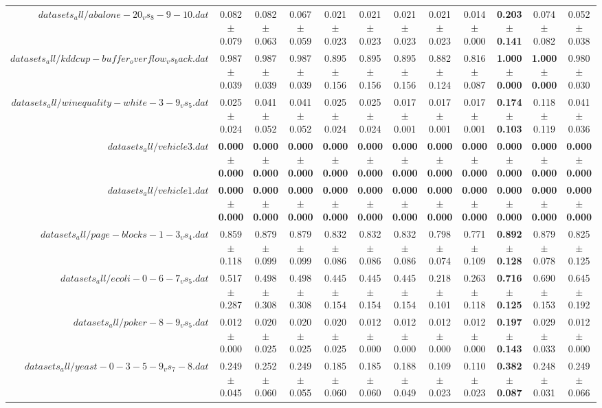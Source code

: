\begin{table}[!ht]
{\begin{tabular}{r c c c c c c c c c c c}
$datasets_all/abalone-20_vs_8-9-10.dat$ & 0.082 $\pm$ 0.079 & 0.082 $\pm$ 0.063 & 0.067 $\pm$ 0.059 & 0.021 $\pm$ 0.023 & 0.021 $\pm$ 0.023 & 0.021 $\pm$ 0.023 & 0.021 $\pm$ 0.023 & 0.014 $\pm$ 0.000 & \textbf{0.203 $\pm$ 0.141} & 0.074 $\pm$ 0.082 & 0.052 $\pm$ 0.038 \\
$datasets_all/kddcup-buffer_overflow_vs_back.dat$ & 0.987 $\pm$ 0.039 & 0.987 $\pm$ 0.039 & 0.987 $\pm$ 0.039 & 0.895 $\pm$ 0.156 & 0.895 $\pm$ 0.156 & 0.895 $\pm$ 0.156 & 0.882 $\pm$ 0.124 & 0.816 $\pm$ 0.087 & \textbf{1.000 $\pm$ 0.000} & \textbf{1.000 $\pm$ 0.000} & 0.980 $\pm$ 0.030 \\
$datasets_all/winequality-white-3-9_vs_5.dat$ & 0.025 $\pm$ 0.024 & 0.041 $\pm$ 0.052 & 0.041 $\pm$ 0.052 & 0.025 $\pm$ 0.024 & 0.025 $\pm$ 0.024 & 0.017 $\pm$ 0.001 & 0.017 $\pm$ 0.001 & 0.017 $\pm$ 0.001 & \textbf{0.174 $\pm$ 0.103} & 0.118 $\pm$ 0.119 & 0.041 $\pm$ 0.036 \\
$datasets_all/vehicle3.dat$ & \textbf{0.000 $\pm$ 0.000} & \textbf{0.000 $\pm$ 0.000} & \textbf{0.000 $\pm$ 0.000} & \textbf{0.000 $\pm$ 0.000} & \textbf{0.000 $\pm$ 0.000} & \textbf{0.000 $\pm$ 0.000} & \textbf{0.000 $\pm$ 0.000} & \textbf{0.000 $\pm$ 0.000} & \textbf{0.000 $\pm$ 0.000} & \textbf{0.000 $\pm$ 0.000} & \textbf{0.000 $\pm$ 0.000} \\
$datasets_all/vehicle1.dat$ & \textbf{0.000 $\pm$ 0.000} & \textbf{0.000 $\pm$ 0.000} & \textbf{0.000 $\pm$ 0.000} & \textbf{0.000 $\pm$ 0.000} & \textbf{0.000 $\pm$ 0.000} & \textbf{0.000 $\pm$ 0.000} & \textbf{0.000 $\pm$ 0.000} & \textbf{0.000 $\pm$ 0.000} & \textbf{0.000 $\pm$ 0.000} & \textbf{0.000 $\pm$ 0.000} & \textbf{0.000 $\pm$ 0.000} \\
$datasets_all/page-blocks-1-3_vs_4.dat$ & 0.859 $\pm$ 0.118 & 0.879 $\pm$ 0.099 & 0.879 $\pm$ 0.099 & 0.832 $\pm$ 0.086 & 0.832 $\pm$ 0.086 & 0.832 $\pm$ 0.086 & 0.798 $\pm$ 0.074 & 0.771 $\pm$ 0.109 & \textbf{0.892 $\pm$ 0.128} & 0.879 $\pm$ 0.078 & 0.825 $\pm$ 0.125 \\
$datasets_all/ecoli-0-6-7_vs_5.dat$ & 0.517 $\pm$ 0.287 & 0.498 $\pm$ 0.308 & 0.498 $\pm$ 0.308 & 0.445 $\pm$ 0.154 & 0.445 $\pm$ 0.154 & 0.445 $\pm$ 0.154 & 0.218 $\pm$ 0.101 & 0.263 $\pm$ 0.118 & \textbf{0.716 $\pm$ 0.125} & 0.690 $\pm$ 0.153 & 0.645 $\pm$ 0.192 \\
$datasets_all/poker-8-9_vs_5.dat$ & 0.012 $\pm$ 0.000 & 0.020 $\pm$ 0.025 & 0.020 $\pm$ 0.025 & 0.020 $\pm$ 0.025 & 0.012 $\pm$ 0.000 & 0.012 $\pm$ 0.000 & 0.012 $\pm$ 0.000 & 0.012 $\pm$ 0.000 & \textbf{0.197 $\pm$ 0.143} & 0.029 $\pm$ 0.033 & 0.012 $\pm$ 0.000 \\
$datasets_all/yeast-0-3-5-9_vs_7-8.dat$ & 0.249 $\pm$ 0.045 & 0.252 $\pm$ 0.060 & 0.249 $\pm$ 0.055 & 0.185 $\pm$ 0.060 & 0.185 $\pm$ 0.060 & 0.188 $\pm$ 0.049 & 0.109 $\pm$ 0.023 & 0.110 $\pm$ 0.023 & \textbf{0.382 $\pm$ 0.087} & 0.248 $\pm$ 0.031 & 0.249 $\pm$ 0.066 \\
\end{tabular}}
\end{table}
